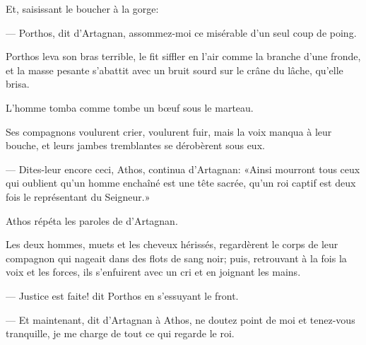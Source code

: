 Et, saisissant le boucher à la gorge:

— Porthos, dit d'Artagnan, assommez-moi ce misérable d'un seul coup de poing.

Porthos leva son bras terrible, le fit siffler en l'air comme la branche d'une fronde, et la masse pesante s'abattit avec un bruit sourd sur le crâne du lâche, qu'elle brisa.

L'homme tomba comme tombe un bœuf sous le marteau.

Ses compagnons voulurent crier, voulurent fuir, mais la voix manqua à leur bouche, et leurs jambes tremblantes se dérobèrent sous eux.

— Dites-leur encore ceci, Athos, continua d'Artagnan: «Ainsi mourront tous ceux qui oublient qu'un homme enchaîné est une tête sacrée, qu'un roi captif est deux fois le représentant du Seigneur.»

Athos répéta les paroles de d'Artagnan.

Les deux hommes, muets et les cheveux hérissés, regardèrent le corps de leur compagnon qui nageait dans des flots de sang noir; puis, retrouvant à la fois la voix et les forces, ils s'enfuirent avec un cri et en joignant les mains.

— Justice est faite! dit Porthos en s'essuyant le front.

— Et maintenant, dit d'Artagnan à Athos, ne doutez point de moi et tenez-vous tranquille, je me charge de tout ce qui regarde le roi.